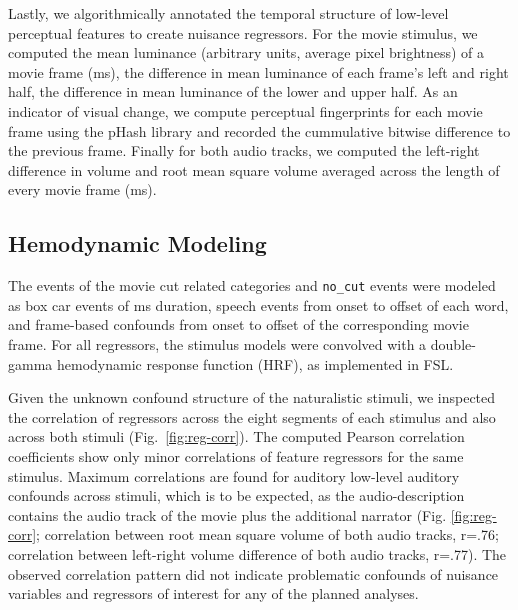 \documentclass[english]{article}
\begin{document}
Lastly, we algorithmically annotated the temporal structure of low-level
perceptual features to create nuisance regressors.
For the movie stimulus, we computed the mean luminance (arbitrary units,
average pixel brightness) of a movie frame (\unit[40]{ms}), the difference in
mean luminance of each frame's left and right half, the difference in mean
luminance of the lower and upper half.  As an indicator of visual change, we
compute perceptual fingerprints for each movie frame using the pHash library
\citep{zauner2010implementation} and recorded the cummulative bitwise
difference to the previous frame.
Finally for both audio tracks, we computed the left-right difference in volume
and root mean square volume averaged across the length of every movie frame
(\unit[40]{ms}).


\subsection{Hemodynamic Modeling}

The events of the movie cut related categories and \texttt{no\_cut} events were
modeled as box car events of \unit[200]{ms} duration,
%
speech events from onset to offset of each word, and frame-based confounds from
onset to offset of the corresponding movie frame.
For all regressors, the stimulus models were convolved with a double-gamma
hemodynamic response function (HRF), as implemented in FSL.

Given the unknown confound structure of the naturalistic stimuli, we inspected
the correlation of regressors across the eight segments of each stimulus and
also across both stimuli (Fig.~\ref{fig:reg-corr}).
The computed Pearson correlation coefficients show only minor correlations of
feature regressors for the same stimulus.
Maximum correlations are found for auditory low-level auditory confounds across
stimuli,
which is to be expected, as the audio-description contains the audio track of
the movie plus the additional narrator (Fig. \ref{fig:reg-corr}; correlation
between root mean square volume of both audio tracks, r=.76; correlation between
left-right volume difference of both audio tracks, r=.77).
The observed correlation pattern did not indicate problematic confounds of
nuisance variables and regressors of interest for any of the planned analyses.
\end{document}
